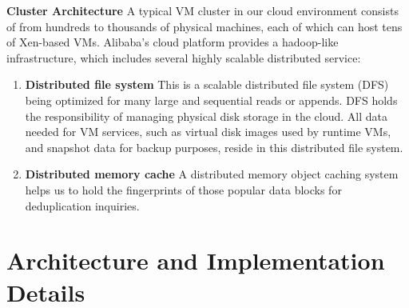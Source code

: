 {%
{\bf Cluster Architecture}
A typical VM cluster in our cloud environment
consists of from hundreds to thousands of physical machines, each of which can
host tens of Xen-based\cite{Barham2003} VMs.
Alibaba's cloud platform provides a hadoop-like infrastructure, 
which includes several highly scalable distributed service:
\begin{enumerate}
\item {\bf Distributed file system} This is a scalable distributed file system (DFS) being optimized for many large and sequential reads or appends. DFS holds the responsibility of managing physical disk storage
in the cloud. All data needed for VM services, such as virtual disk images used by runtime VMs,
and snapshot data for backup purposes, reside in this distributed file system. 
\item {\bf Distributed memory cache} A distributed memory object caching system helps us to hold the fingerprints of those popular data blocks for deduplication inquiries. 
\end{enumerate}
}

\section{Architecture and Implementation Details}
\label{sec:arch}



